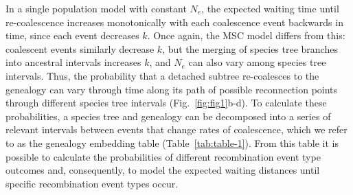 \documentclass[11pt]{article}
\begin{document}
In a single population model with constant $N_e$, the expected waiting time until 
re-coalescence increases monotonically with each coalescence event 
backwards in time, since each event decreases $k$.
Once again, the MSC model differs from this: 
coalescent events similarly decrease $k$, but the merging of 
species tree branches into ancestral intervals increases $k$, and $N_e$ 
can also vary among species tree intervals. 
Thus, the probability that a detached subtree re-coalesces to the genealogy 
can vary through time along its path of possible reconnection points through 
different species tree intervals
(Fig.~\ref{fig:fig1}b-d).
To calculate these probabilities, a species tree and genealogy can be decomposed into a 
series of relevant intervals between events that change rates of coalescence,
which we refer to as the genealogy embedding table (Table~\ref{tab:table-1}). 
From this table it is possible to calculate the probabilities of different
recombination event type outcomes and, consequently, to model the expected 
waiting distances until specific recombination event types occur. 

\end{document}
